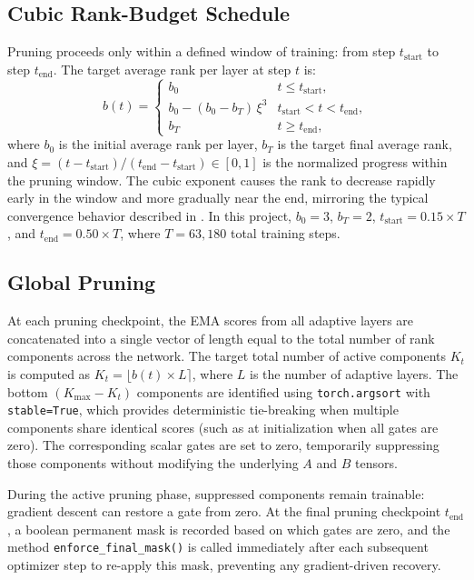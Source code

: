 \documentclass[conference]{IEEEtran}
\begin{document}
\subsection{Cubic Rank-Budget Schedule}
Pruning proceeds only within a defined window of training:
from step $t_{\text{start}}$ to step $t_{\text{end}}$. The
target average rank per layer at step $t$ is:
\begin{equation}
  b(t) = \begin{cases}
    b_0 & t \leq t_{\text{start}}, \\[4pt]
    b_0 - (b_0 - b_T)\,\xi^3 & t_{\text{start}} < t < t_{\text{end}}, \\[4pt]
    b_T & t \geq t_{\text{end}},
  \end{cases}
  \label{eq:schedule}
\end{equation}
where $b_0$ is the initial average rank per layer, $b_T$ is
the target final average rank, and
$\xi = (t - t_{\text{start}}) / (t_{\text{end}} -
t_{\text{start}}) \in [0, 1]$ is the normalized progress
within the pruning window. The cubic exponent causes the rank
to decrease rapidly early in the window and more gradually
near the end, mirroring the typical convergence behavior
described in \cite{chen2024dora}. In this project,
$b_0 = 3$, $b_T = 2$, $t_{\text{start}} = 0.15 \times T$,
and $t_{\text{end}} = 0.50 \times T$, where $T = 63{,}180$
total training steps.

\subsection{Global Pruning}
At each pruning checkpoint, the EMA scores from all adaptive
layers are concatenated into a single vector of length equal
to the total number of rank components across the network.
The target total number of active components $K_t$ is
computed as $K_t = \lfloor b(t) \times L \rceil$, where $L$
is the number of adaptive layers. The bottom
$(K_{\max} - K_t)$ components are identified using
\texttt{torch.argsort} with \texttt{stable=True}, which
provides deterministic tie-breaking when multiple components
share identical scores (such as at initialization when all
gates are zero). The corresponding scalar gates are set to
zero, temporarily suppressing those components without
modifying the underlying $A$ and $B$ tensors.

During the active pruning phase, suppressed components remain
trainable: gradient descent can restore a gate from zero. At
the final pruning checkpoint $t_{\text{end}}$, a boolean
permanent mask is recorded based on which gates are zero,
and the method \texttt{enforce\_final\_mask()} is called
immediately after each subsequent optimizer step to re-apply
this mask, preventing any gradient-driven recovery.
\end{document}
